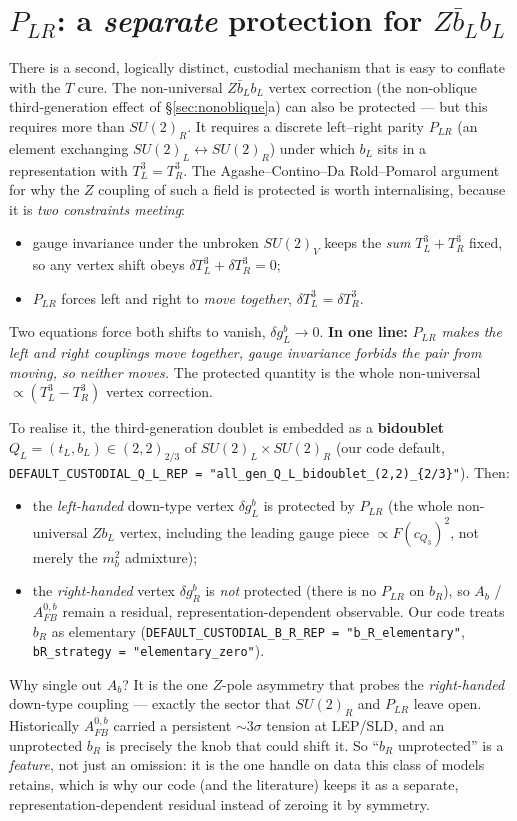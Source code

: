 \documentclass[11pt]{article}
\newcommand{\SUL}{SU(2)_L}
\newcommand{\SUR}{SU(2)_R}
\newcommand{\PLR}{P_{LR}}
\newcommand{\code}[1]{\texttt{#1}}
\theoremstyle{definition}
\begin{document}
\section{$\PLR$: a \emph{separate} protection for $Z\bar b_L b_L$}
\label{sec:PLR}

There is a second, logically distinct, custodial mechanism that is easy to
conflate with the $T$ cure. The non-universal $Z\bar b_L b_L$ vertex correction
(the non-oblique third-generation effect of \S\ref{sec:nonoblique}a) can also be
protected --- but this requires more than $\SUR$. It requires a discrete
left--right parity $\PLR$ (an element exchanging $\SUL \leftrightarrow \SUR$)
under which $b_L$ sits in a representation with $T^3_L = T^3_R$. The
Agashe--Contino--Da Rold--Pomarol argument for why the $Z$ coupling of such a
field is protected is worth internalising, because it is \emph{two constraints
meeting}:
\begin{itemize}[leftmargin=1.4em]
\item gauge invariance under the unbroken $SU(2)_V$ keeps the \emph{sum}
$T^3_L+T^3_R$ fixed, so any vertex shift obeys $\delta T^3_L+\delta T^3_R=0$;
\item $\PLR$ forces left and right to \emph{move together},
$\delta T^3_L=\delta T^3_R$.
\end{itemize}
Two equations force both shifts to vanish, $\delta g_L^b\to 0$. \textbf{In one
line:} \emph{$\PLR$ makes the left and right couplings move together, gauge
invariance forbids the pair from moving, so neither moves.} The protected
quantity is the whole non-universal $\propto(T^3_L-T^3_R)$ vertex correction.

To realise it, the third-generation doublet is embedded as a \textbf{bidoublet}
$Q_L = (t_L, b_L) \in (2,2)_{2/3}$ of $\SUL\times\SUR$ (our code default,
\code{DEFAULT\_CUSTODIAL\_Q\_L\_REP = "all\_gen\_Q\_L\_bidoublet\_(2,2)\_\{2/3\}"}).
Then:
\begin{itemize}[leftmargin=1.4em]
\item the \emph{left-handed} down-type vertex $\delta g_L^b$ is protected by
$\PLR$ (the whole non-universal $Zb_L$ vertex, including the leading gauge piece
$\propto F(c_{Q_3})^2$, not merely the $m_b^2$ admixture);
\item the \emph{right-handed} vertex $\delta g_R^b$ is \emph{not} protected
(there is no $\PLR$ on $b_R$), so $A_b$ / $A_{FB}^{0,b}$ remain a residual,
representation-dependent observable. Our code treats $b_R$ as elementary
(\code{DEFAULT\_CUSTODIAL\_B\_R\_REP = "b\_R\_elementary"},
\code{bR\_strategy = "elementary\_zero"}).
\end{itemize}
\noindent Why single out $A_b$? It is the one $Z$-pole asymmetry that probes the
\emph{right-handed} down-type coupling --- exactly the sector that $\SUR$ and
$\PLR$ leave open. Historically $A_{FB}^{0,b}$ carried a persistent $\sim3\sigma$
tension at LEP/SLD, and an unprotected $b_R$ is precisely the knob that could
shift it. So ``$b_R$ unprotected'' is a \emph{feature}, not just an omission: it
is the one handle on data this class of models retains, which is why our code
(and the literature) keeps it as a separate, representation-dependent residual
instead of zeroing it by symmetry.
\end{document}
